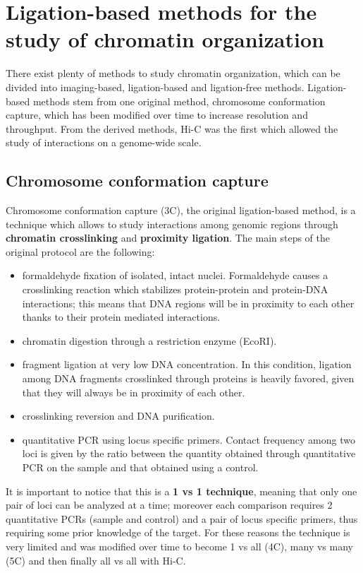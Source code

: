 \newpage
\section{Ligation-based methods for the study of chromatin organization}

There exist plenty of methods to study chromatin organization, which can be divided into imaging-based, ligation-based and ligation-free methods. Ligation-based methods stem from one original method, chromosome conformation capture\cite{3coriginal2002}, which has been modified over time to increase resolution and throughput. From the derived methods, Hi-C was the first which allowed the study of interactions on a genome-wide scale.

\subsection{Chromosome conformation capture}
Chromosome conformation capture (3C), the original ligation-based method, is a technique which allows to study interactions among genomic regions through \textbf{chromatin crosslinking} and \textbf{proximity ligation}\cite{3coriginal2002}. The main steps of the original protocol are the following:
\begin{itemize}\tightlist
  \item formaldehyde fixation of isolated, intact nuclei. Formaldehyde causes a crosslinking reaction which stabilizes protein-protein and protein-DNA interactions; this means that DNA regions will be in proximity to each other thanks to their protein mediated interactions. 
  \item chromatin digestion through a restriction enzyme (EcoRI).
  \item fragment ligation at very low DNA concentration. In this condition, ligation among DNA fragments crosslinked through proteins is heavily favored, given that they will always be in proximity of each other.
  \item crosslinking reversion and DNA purification.
  \item quantitative PCR using locus specific primers. Contact frequency among two loci is given by the ratio between the quantity obtained through quantitative PCR on the sample and that obtained using a control.
\end{itemize}
It is important to notice that this is a \textbf{1 vs 1 technique}, meaning that only one pair of loci can be analyzed at a time; moreover each comparison requires 2 quantitative PCRs (sample and control) and a pair of locus specific primers, thus requiring some prior knowledge of the target. For these reasons the technique is very limited and was modified over time to become 1 vs all (4C\cite{4cprotocol2006}), many vs many (5C\cite{5cprotocol2006}) and then finally all vs all with Hi-C.


